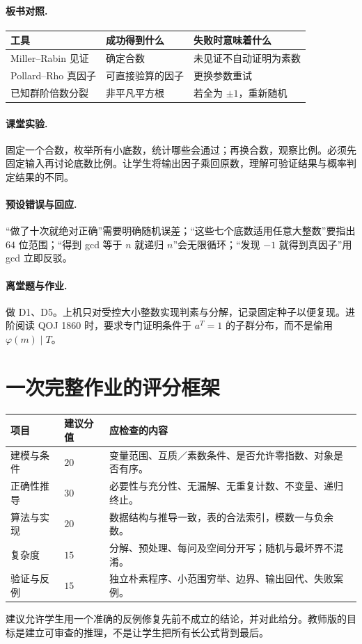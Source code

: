 \documentclass[UTF8,a4paper,11pt,twoside,openright,fontset=fandol]{ctexbook}
\theoremstyle{definition}
\begin{document}
\paragraph{板书对照.}
\begin{center}
\begin{tabular}{lll}
\toprule
工具 & 成功得到什么 & 失败时意味着什么\\\midrule
Miller--Rabin 见证 & 确定合数 & 未见证不自动证明为素数\\
Pollard--Rho 真因子 & 可直接验算的因子 & 更换参数重试\\
已知群阶倍数分裂 & 非平凡平方根 & 若全为 $\pm1$，重新随机\\\bottomrule
\end{tabular}
\end{center}
\paragraph{课堂实验.} 固定一个合数，枚举所有小底数，统计哪些会通过；再换合数，观察比例。必须先固定输入再讨论底数比例。让学生将输出因子乘回原数，理解可验证结果与概率判定结果的不同。
\paragraph{预设错误与回应.} “做了十次就绝对正确”需要明确随机误差；“这些七个底数适用任意大整数”要指出 $64$ 位范围；“得到 gcd 等于 $n$ 就递归 $n$”会无限循环；“发现 $-1$ 就得到真因子”用 gcd 立即反驳。
\paragraph{离堂题与作业.} 做 D1、D5。上机只对受控大小整数实现判素与分解，记录固定种子以便复现。进阶阅读 QOJ 1860 时，要求专门证明条件于 $a^T=1$ 的子群分布，而不是偷用 $\varphi(m)\mid T$。

\section{一次完整作业的评分框架}
\begin{longtable}{p{}p{}p{}}
\toprule
项目 & 建议分值 & 应检查的内容\\\midrule
建模与条件 & $20$ & 变量范围、互质／素数条件、是否允许零指数、对象是否有序。\\
正确性推导 & $30$ & 必要性与充分性、无漏解、无重复计数、不变量、递归终止。\\
算法与实现 & $20$ & 数据结构与推导一致，表的合法索引，模数一与负余数。\\
复杂度 & $15$ & 分解、预处理、每问及空间分开写；随机与最坏界不混淆。\\
验证与反例 & $15$ & 独立朴素程序、小范围穷举、边界、输出回代、失败案例。\\\bottomrule
\end{longtable}
建议允许学生用一个准确的反例修复先前不成立的结论，并对此给分。教师版的目标是建立可审查的推理，不是让学生把所有长公式背到最后。
\end{document}
